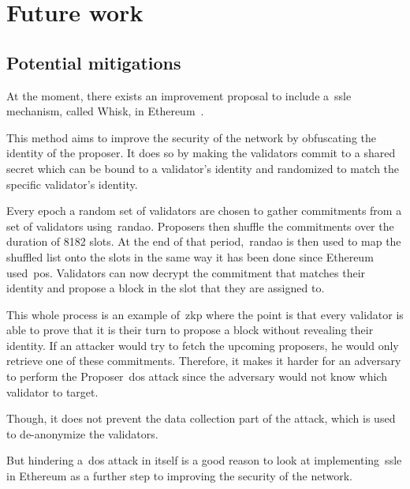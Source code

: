 

\section{Future work}\label{sec:future-works}

\subsection{Potential mitigations}\label{subsec:potential-mitigations}
At the moment, there exists an improvement proposal
to include a~\gls{ssle} mechanism, called Whisk, in Ethereum~\cite{EthereumResearchSSLE2024}.

This method aims to improve the security of the network by obfuscating the identity of the proposer.
It does so by making the validators commit to a shared secret which can be bound to a validator's identity and randomized to match the specific validator's identity.

Every epoch a random set of validators are chosen to gather commitments from a set of validators using~\gls{randao}.
Proposers then shuffle the commitments over the duration of 8182 slots.
At the end of that period,~\gls{randao} is then used to map the shuffled list onto the slots in the same way it has been done since Ethereum used~\gls{pos}.
Validators can now decrypt the commitment that matches their identity and propose a block in the slot that they are assigned to.

This whole process is an example of~\gls{zkp} where the point is that every validator is able to prove that it is their turn to propose a block without revealing their identity.
If an attacker would try to fetch the upcoming proposers, he would only retrieve one of these commitments.
Therefore, it makes it harder
for an adversary to perform the Proposer~\gls{dos} attack since the adversary would not know which validator to target.

Though, it does not prevent the data collection part of the attack, which is used to de-anonymize the validators.

But hindering a~\gls{dos} attack in itself is a good reason
to look at implementing~\gls{ssle} in Ethereum as a further step to improving the security of the network.


